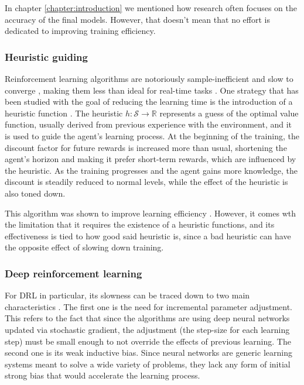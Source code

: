 In chapter \ref{chapter:introduction} we mentioned how research often focuses on the accuracy of the final models. However, that doesn't mean that no effort is dedicated to improving training efficiency.

\subsubsection*{Heuristic guiding}

Reinforcement learning algorithms are notoriously sample-inefficient and slow to converge \cite{Botvinick:2019}, making them less than ideal for real-time tasks \cite{Bianchi:2004}. One strategy that has been studied with the goal of reducing the learning time is the introduction of a heuristic function \cite{Cheng:2021}. The heuristic $h:\mathcal{S}\to\mathbb{R}$ represents a guess of the optimal value function, usually derived from previous experience with the environment, and it is used to guide the agent's learning process. At the beginning of the training, the discount factor for future rewards is increased more than usual, shortening the agent's horizon and making it prefer short-term rewards, which are influenced by the heuristic. As the training progresses and the agent gains more knowledge, the discount is steadily reduced to normal levels, while the effect of the heuristic is also toned down.

This algorithm was shown to improve learning efficiency \cite{Cheng:2021}. However, it comes wth the limitation that it requires the existence of a heuristic functions, and its effectiveness is tied to how good said heuristic is, since a bad heuristic can have the opposite effect of slowing down training.

\subsubsection*{Deep reinforcement learning}

For DRL in particular, its slowness can be traced down to two main characteristics \cite{Botvinick:2019}. The first one is the need for incremental parameter adjustment. This refers to the fact that since the algorithms are using deep neural networks updated via stochastic gradient, the adjustment (the step-size for each learning step) must be small enough to not override the effects of previous learning. The second one is its weak inductive bias. Since neural networks are generic learning systems meant to solve a wide variety of problems, they lack any form of initial strong bias that would accelerate the learning process.


